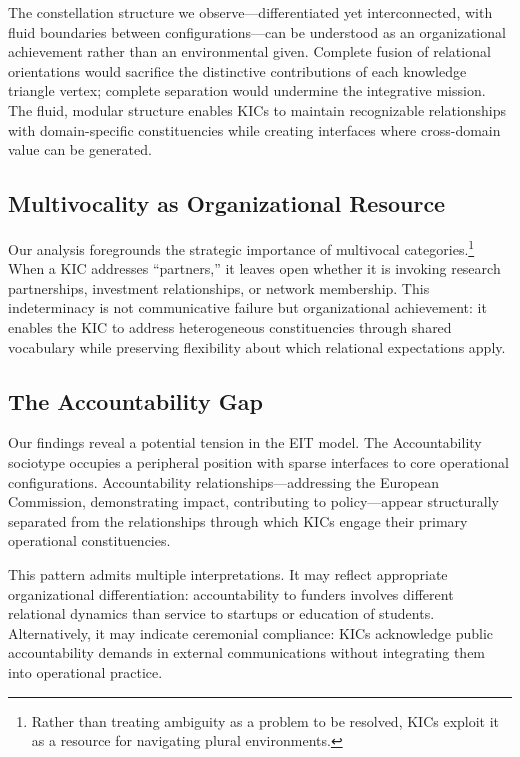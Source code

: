 \documentclass[../main.tex]{subfiles}
\begin{document}
The constellation structure we observe---differentiated yet interconnected, with fluid boundaries between configurations---can be understood as an organizational achievement rather than an environmental given. Complete fusion of relational orientations would sacrifice the distinctive contributions of each knowledge triangle vertex; complete separation would undermine the integrative mission. The fluid, modular structure enables KICs to maintain recognizable relationships with domain-specific constituencies while creating interfaces where cross-domain value can be generated.

\subsection{Multivocality as Organizational Resource}

Our analysis foregrounds the strategic importance of multivocal categories.\footnote{Rather than treating ambiguity as a problem to be resolved, KICs exploit it as a resource for navigating plural environments.} When a KIC addresses ``partners,'' it leaves open whether it is invoking research partnerships, investment relationships, or network membership. This indeterminacy is not communicative failure but organizational achievement: it enables the KIC to address heterogeneous constituencies through shared vocabulary while preserving flexibility about which relational expectations apply.

\subsection{The Accountability Gap}

Our findings reveal a potential tension in the EIT model. The Accountability sociotype occupies a peripheral position with sparse interfaces to core operational configurations. Accountability relationships---addressing the European Commission, demonstrating impact, contributing to policy---appear structurally separated from the relationships through which KICs engage their primary operational constituencies.

This pattern admits multiple interpretations. It may reflect appropriate organizational differentiation: accountability to funders involves different relational dynamics than service to startups or education of students. Alternatively, it may indicate ceremonial compliance: KICs acknowledge public accountability demands in external communications without integrating them into operational practice.
\end{document}
